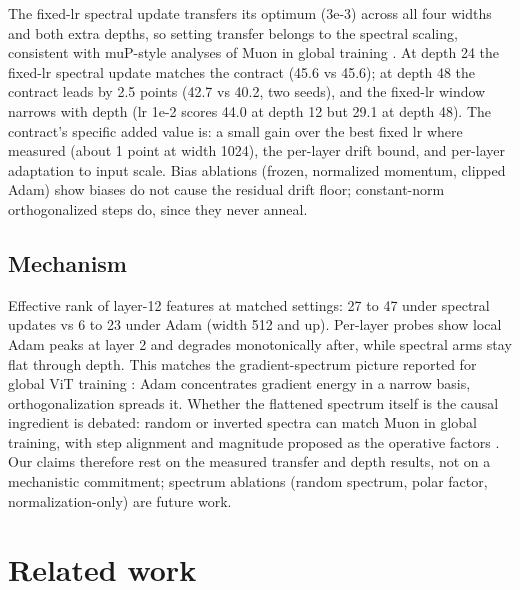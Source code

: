 \documentclass[11pt]{article}
\begin{document}
The fixed-lr spectral update transfers its optimum (3e-3) across all four widths and both extra depths, so setting transfer belongs to the spectral scaling, consistent with muP-style analyses of Muon in global training \citep{bernstein2024old,yang2022tensor}. At depth 24 the fixed-lr spectral update matches the contract (45.6 vs 45.6); at depth 48 the contract leads by 2.5 points (42.7 vs 40.2, two seeds), and the fixed-lr window narrows with depth (lr 1e-2 scores 44.0 at depth 12 but 29.1 at depth 48). The contract's specific added value is: a small gain over the best fixed lr where measured (about 1 point at width 1024), the per-layer drift bound, and per-layer adaptation to input scale. Bias ablations (frozen, normalized momentum, clipped Adam) show biases do not cause the residual drift floor; constant-norm orthogonalized steps do, since they never anneal.

\subsection{Mechanism}

Effective rank of layer-12 features at matched settings: 27 to 47 under spectral updates vs 6 to 23 under Adam (width 512 and up). Per-layer probes show local Adam peaks at layer 2 and degrades monotonically after, while spectral arms stay flat through depth. This matches the gradient-spectrum picture reported for global ViT training \citep{southworth2026muon}: Adam concentrates gradient energy in a narrow basis, orthogonalization spreads it. Whether the flattened spectrum itself is the causal ingredient is debated: random or inverted spectra can match Muon in global training, with step alignment and magnitude proposed as the operative factors \citep{shumaylov2026muon}. Our claims therefore rest on the measured transfer and depth results, not on a mechanistic commitment; spectrum ablations (random spectrum, polar factor, normalization-only) are future work.

\section{Related work}
\end{document}
